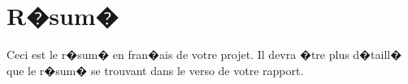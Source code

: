 \chapter*{R�sum�}

Ceci est le r�sum� en fran�ais de votre projet. Il devra �tre plus d�taill� que le r�sum� se trouvant dans le verso de votre rapport.